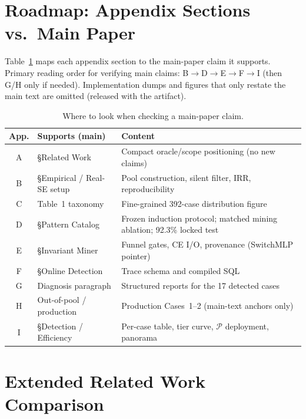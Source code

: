 \documentclass[sigconf,nonacm]{acmart}
\begin{document}
\section*{Roadmap: Appendix Sections vs.\ Main Paper}
\label{app:roadmap}
\noindent
Table~\ref{tab:app-roadmap} maps each appendix section to the main-paper claim it supports.
Primary reading order for verifying main claims: B$\to$D$\to$E$\to$F$\to$I (then G/H only if needed).
Implementation dumps and figures that only restate the main text are omitted (released with the artifact).

\begin{table}[H]
\centering
\small
\caption{Where to look when checking a main-paper claim.}
\label{tab:app-roadmap}
\begin{tabularx}{\linewidth}{@{}c >{\raggedright\arraybackslash}X >{\raggedright\arraybackslash}X@{}}
\toprule
\textbf{App.} & \textbf{Supports (main)} & \textbf{Content} \\
\midrule
A & \S Related Work & Compact oracle/scope positioning (no new claims) \\
B & \S Empirical / Real-SE setup & Pool construction, silent filter, IRR, reproducibility \\
C & Table~1 taxonomy & Fine-grained 392-case distribution figure \\
D & \S Pattern Catalog & Frozen induction protocol; matched mining ablation; 92.3\% locked test \\
E & \S Invariant Miner & Funnel gates, CE I/O, provenance (SwitchMLP pointer) \\
F & \S Online Detection & Trace schema and compiled SQL \\
G & Diagnosis paragraph & Structured reports for the 17 detected cases \\
H & Out-of-pool / production & Production Cases~1--2 (main-text anchors only) \\
I & \S Detection / Efficiency & Per-case table, tier curve, $\mathcal{P}$ deployment, panorama \\
\bottomrule
\end{tabularx}
\end{table}

\section{Extended Related Work Comparison}
\label{app:related-work-comparison}
\end{document}
